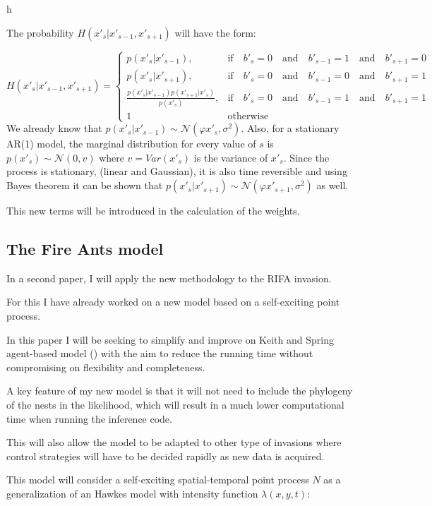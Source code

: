 h\documentclass[11pt,a4paper]{article}
\begin{document}
The probability $H(x'_s|x'_{s-1}, x'_{s+1})$ will have the form:

\[
H(x'_s|x'_{s-1}, x'_{s+1}) = \begin{cases} p(x'_s|x'_{s-1}), & \mbox{if} \quad b'_s = 0  \quad \mbox{and} \quad b'_{s-1} = 1 \quad \mbox{and} \quad b'_{s+1} = 0\\ 
p(x'_s|x'_{s+1}), & \mbox{if} \quad b'_s = 0  \quad \mbox{and} \quad b'_{s-1} = 0 \quad \mbox{and} \quad b'_{s+1} = 1\\
\frac{p(x'_s|x'_{s-1})p(x'_{s+1}|x'_s)}{p(x'_s)}, & \mbox{if} \quad b'_s = 0  \quad \mbox{and} \quad b'_{s-1} = 1 \quad \mbox{and} \quad b'_{s+1} = 1\\
1 & \mbox{otherwise} \end{cases}
\]
We already know that $p(x'_s|x'_{s-1}) \sim \mathcal{N} (\varphi x'_{s}, \sigma^{2})$. Also, for a stationary AR(1) model, the marginal distribution for every value of $s$ is $p(x'_{s}) \sim \mathcal{N}(0, v)$ where $v = Var(x'_s)$ is the variance of $x'_s$. Since the process is stationary, (linear and Gaussian), it is also time reversible and using Bayes theorem it can be shown that $p(x'_{s}|x'_{s+1}) \sim \mathcal{N} (\varphi x'_{s+1}, \sigma^{2})$ as well.

This new terms will be introduced in the calculation of the weights.

\subsection{The Fire Ants model}

In a second paper, I will apply the new methodology to the RIFA invasion.

For this I have already worked on a new model based on a self-exciting point process.

In this paper I will be seeking to simplify and improve on Keith and Spring agent-based model (\cite{Keith}) with the aim to reduce the running time without compromising on flexibility and completeness.

A key feature of my new model is that it will not need to include the phylogeny of the nests in the likelihood, which will result in a much lower computational time when running the inference code.

This will also allow the model to be adapted to other type of invasions where control strategies will have to be decided rapidly as new data is acquired.

This model will consider a self-exciting spatial-temporal point process $N$ as a generalization of an Hawkes model with intensity function $\lambda(x, y, t)$: 
\end{document}
